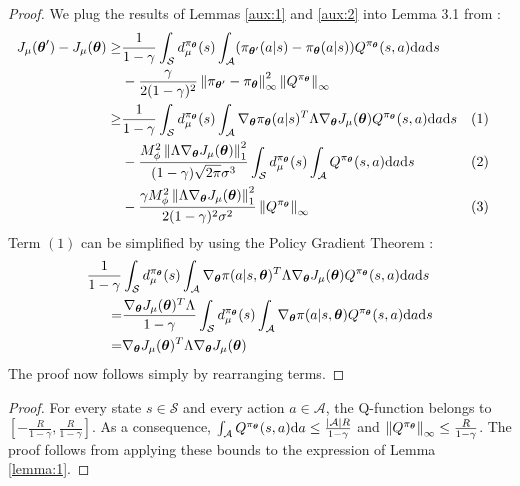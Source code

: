 \firstlemma*
\begin{proof}
We plug the results of Lemmas \ref{aux:1} and \ref{aux:2} into Lemma 3.1 from \cite{NIPS2013_5186}:
\begin{align*}
J_{\mu}(\vtheta') - J_{\mu}(\vtheta) \geq  
	& \frac{1}{1-\gamma} \int_{\mathcal{S}}d_{\mu}^{\pi_{\vtheta}}(s)
	\int_{\mathcal{A}} (\pi_{\vtheta'}(a|s) - \pi_{\vtheta}(a|s))Q^{\pi_{\vtheta}}(s,a)\mathrm{d}a\mathrm{d}s \\
	& -\frac{\gamma}{2(1-\gamma)^2} \norm[\infty]{\pi_{\vtheta'}-\pi_{\vtheta}}^2 \norm[\infty]{Q^{\pi_{\vtheta}}} \\
	\geq & 
		\frac{1}{1-\gamma} \int_{\mathcal{S}}d_{\mu}^{\pi_{\vtheta}}(s)
		\int_{\mathcal{A}}
		\nabla_{\vtheta}\pi_{\vtheta}(a|s)^T\Lambda\gradJ{\vtheta}
		Q^{\pi_{\vtheta}}(s,a)\mathrm{d}a\mathrm{d}s && (1) \\
		& - \frac{M_{\phi}^2\norm[1]{\Lambda\gradJ{\vtheta}}^2}
		{(1-\gamma)\sqrt{2\pi}\sigma^3}
		\int_{\mathcal{S}}d_{\mu}^{\pi_{\vtheta}}(s)
		\int_{\mathcal{A}} 
		Q^{\pi_{\vtheta}}(s,a)\mathrm{d}a\mathrm{d}s && (2) \\ 
		&  -\frac{\gamma M_{\phi}^2\norm[1]{\Lambda\gradJ{\vtheta}}^2}
		{2(1-\gamma)^2\sigma^2}\norm[\infty]{Q^{\pi_{\vtheta}}}	&& (3)
\end{align*}
Term $(1)$ can be simplified by using the Policy Gradient Theorem \cite{NIPS1999_1713}:
\begin{align*}
\frac{1}{1-\gamma} &  \int_{\mathcal{S}}d_{\mu}^{\pi_{\vtheta}}(s)
		\int_{\mathcal{A}}
		\nabla_{\vtheta}\pi(a|s,\vtheta)^T\Lambda\gradJ{\vtheta}
		Q^{\pi_{\vtheta}}(s,a)\mathrm{d}a\mathrm{d}s \\
		= & \frac{\gradJ{\vtheta}^T\Lambda}{1-\gamma}
		\int_{\mathcal{S}}d_{\mu}^{\pi_{\vtheta}}(s)
		\int_{\mathcal{A}}
		\nabla_{\vtheta}\pi(a|s,\vtheta)Q^{\pi_{\vtheta}}(s,a)\mathrm{d}a\mathrm{d}s \\
		= & \gradJ{\vtheta}^T\Lambda\gradJ{\vtheta}
\end{align*}
The proof now follows simply by rearranging terms.
\end{proof}


\firsttheorem*
\begin{proof}
For every state $s \in \mathcal{S}$ and every action $a \in \mathcal{A}$, the Q-function belongs to $\left[-\frac{R}{1-\gamma},\frac{R}{1-\gamma}\right]$. As a consequence, $\int_{\mathcal{A}}Q^{\pi_{\vtheta}}(s,a)\mathrm{d}a \leq \frac{|\mathcal{A}|R}{1-\gamma}$ and $\norm[\infty]{Q^{\pi_{\vtheta}}} \leq \frac{R}{1-\gamma}$. The proof follows from applying these bounds to the expression of Lemma \ref{lemma:1}.
\end{proof}

